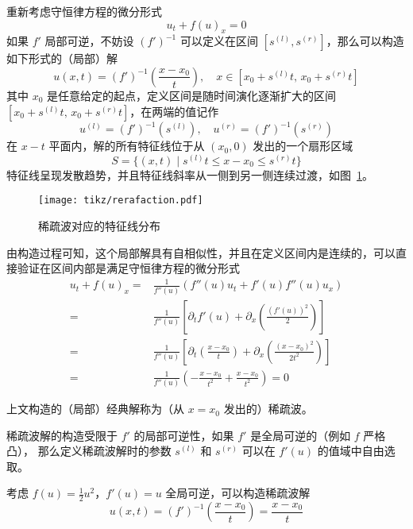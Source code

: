 重新考虑守恒律方程的微分形式
\[
    u_t + f(u)_x = 0
\]
如果 $f'$ 局部可逆，不妨设 $(f')^{-1}$ 可以定义在区间 $[s^{(l)},s^{(r)}]$，那么可以构造如下形式的（局部）解
\[
    u(x,t) = (f')^{-1}\left(\frac{x-x_0}{t}\right), \quad  x \in [x_0 + s^{(l)}t ,\, x_0 +s^{(r)} t ]
\]
其中 $x_0$ 是任意给定的起点，定义区间是随时间演化逐渐扩大的区间 $[x_0 + s^{(l)}t ,\, x_0 + s^{(r)} t]$，在两端的值记作
\[
    u^{(l)} = (f')^{-1}(s^{(l)}), \quad
    u^{(r)} = (f')^{-1}(s^{(r)})
\]
在 $x\!-\!t$ 平面内，解的所有特征线位于从 $(x_0,0)$ 发出的一个扇形区域
\[
    S = \{(x,t) \mid s^{(l)} t \le x - x_0 \le s^{(r)} t \}
\]
特征线呈现发散趋势，并且特征线斜率从一侧到另一侧连续过渡，如图~\ref{fig:rarefaction}。

\begin{figure}[htbp]
    \centering
    \texttt{[image: tikz/rerafaction.pdf]}
    \caption{稀疏波对应的特征线分布} \label{fig:rarefaction}
\end{figure}

由构造过程可知，这个局部解具有自相似性，并且在定义区间内是连续的，可以直接验证在区间内部是满足守恒律方程的微分形式
\begin{align*}
    u_t + f(u)_x ={} &
    \frac{1}{f''(u)} (f''(u) u_t + f'(u) f''(u) u_x)                                                                                                 \\
    ={}              & \frac{1}{f''(u)} \left[ \partial_t f'(u) + \partial_x \left( \frac{(f'(u))^2}2 \right)\right]                                 \\
    ={}              & \frac{1}{f''(u)} \left[  \partial_t \left( \frac{x-x_0}{t} \right) + \partial_x \left( \frac{(x-x_0)^2}{2t^2} \right) \right] \\
    ={}              & \frac{1}{f''(u)} \left( - \frac{x-x_0}{t^2} + \frac{x-x_0}{t^2} \right) = 0
\end{align*}

\begin{definition}
    上文构造的（局部）经典解称为（从 $x=x_0$ 发出的）稀疏波。
\end{definition}

\begin{remark*}
    稀疏波解的构造受限于 $f'$ 的局部可逆性，如果 $f'$ 是全局可逆的（例如 $f$ 严格凸），
    那么定义稀疏波解时的参数 $s^{(l)}$ 和 $s^{(r)}$ 可以在 $f'(u)$ 的值域中自由选取。
\end{remark*}

\begin{example}
    考虑 $f(u) = \frac12 u^2$，$f'(u) = u$ 全局可逆，可以构造稀疏波解
    \[
        u(x,t) = (f')^{-1}\left(\frac{x-x_0}{t}\right) = \frac{x-x_0}{t}
    \]
\end{example}

